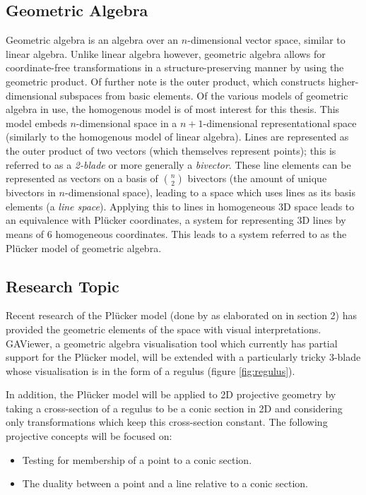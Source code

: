\documentclass[a4paper, 10pt]{article}
\begin{document}
\subsection{Geometric Algebra}
Geometric algebra\cite{dorst2009geometric} is an algebra over an $n$-dimensional
vector space, similar to
linear algebra. Unlike linear algebra however, geometric algebra allows for
coordinate-free transformations in a structure-preserving manner by using the
geometric product. Of further note is the outer product, which constructs
higher-dimensional subspaces from basic elements. Of the various models of
geometric algebra in use, the homogenous model is of most interest for this thesis.
This model embeds $n$-dimensional space in a $n + 1$-dimensional representational
space (similarly to the homogenous model of linear algebra).  Lines are
represented as the outer product of two vectors (which themselves represent
points); this is referred to as a \emph{2-blade} or more generally a
\emph{bivector}. These line elements can be represented as vectors on a basis of
$n \choose 2$ bivectors (the amount of unique bivectors in $n$-dimensional
space), leading to a space which uses lines as its basis elements (a \emph{line
space}). Applying this to lines in homogeneous 3D space leads to an equivalence
with Pl\"{u}cker coordinates, a system for representing 3D lines by means of 6
homogeneous coordinates. This leads to a system referred to as the Pl\"{u}cker
model of geometric algebra.

\subsection{Research Topic}
Recent research of the Pl\"{u}cker model (done by \cite{hangbo2011}
\cite{dorst2013versors} \cite{pottmann2001computational} \cite{dekok2012} as
elaborated on in section 2) has provided the geometric elements of the space
with visual interpretations. GAViewer, a geometric algebra visualisation tool
which currently has partial support for the Pl\"{u}cker model, will be extended
with a particularly tricky 3-blade whose visualisation is in the form of a
regulus (figure \ref{fig:regulus}).

In addition, the Pl\"{u}cker model will be applied to 2D projective geometry by
taking a cross-section of a regulus to be a conic section in 2D and considering
only transformations which keep this cross-section constant. The following
projective concepts will be focused on:
\begin{itemize}
  \item Testing for membership of a point to a conic section.
  \item The duality between a point and a line relative to a conic section.
\end{itemize}
\end{document}
